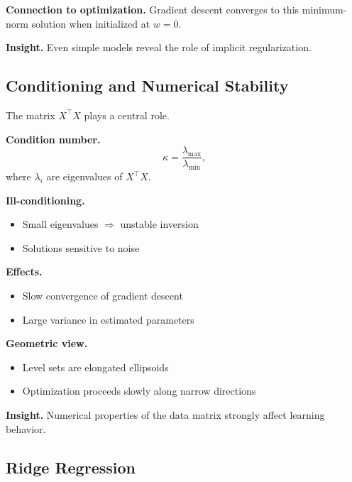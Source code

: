 \medskip

\noindent
\textbf{Connection to optimization.}  
Gradient descent converges to this minimum-norm solution when initialized at $w=0$.

\medskip

\noindent
\textbf{Insight.}  
Even simple models reveal the role of implicit regularization.

\subsection{Conditioning and Numerical Stability}

The matrix $X^\top X$ plays a central role.

\medskip

\noindent
\textbf{Condition number.}
\[
\kappa = \frac{\lambda_{\max}}{\lambda_{\min}},
\]
where $\lambda_i$ are eigenvalues of $X^\top X$.

\medskip

\noindent
\textbf{Ill-conditioning.}
\begin{itemize}
    \item Small eigenvalues $\Rightarrow$ unstable inversion
    \item Solutions sensitive to noise
\end{itemize}

\medskip

\noindent
\textbf{Effects.}
\begin{itemize}
    \item Slow convergence of gradient descent
    \item Large variance in estimated parameters
\end{itemize}

\medskip

\noindent
\textbf{Geometric view.}
\begin{itemize}
    \item Level sets are elongated ellipsoids
    \item Optimization proceeds slowly along narrow directions
\end{itemize}

\medskip

\noindent
\textbf{Insight.}  
Numerical properties of the data matrix strongly affect learning behavior.

\subsection{Ridge Regression}

